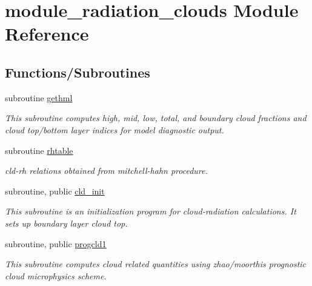 \hypertarget{namespacemodule__radiation__clouds}{}\section{module\+\_\+radiation\+\_\+clouds Module Reference}
\label{namespacemodule__radiation__clouds}
\subsection*{Functions/\+Subroutines}
\begin{DoxyCompactItemize}
\item 
subroutine \hyperlink{group__module__radiation__clouds_gade00b72417f507bb7b07bc58dad58a61}{gethml}
\begin{DoxyCompactList}\small\item\em This subroutine computes high, mid, low, total, and boundary cloud fractions and cloud top/bottom layer indices for model diagnostic output. \end{DoxyCompactList}\item 
subroutine \hyperlink{group__module__radiation__clouds_gaf2368d9f176e9ab76bd9bd7cd687f491}{rhtable}
\begin{DoxyCompactList}\small\item\em cld-\/rh relations obtained from mitchell-\/hahn procedure. \end{DoxyCompactList}\end{DoxyCompactItemize}
{\bf }\par
\begin{DoxyCompactItemize}
\item 
subroutine, public \hyperlink{group__module__radiation__clouds_ga026c2d6859be7119ee7ff11fe760dfcc}{cld\+\_\+init}
\begin{DoxyCompactList}\small\item\em This subroutine is an initialization program for cloud-\/radiation calculations. It sets up boundary layer cloud top. \end{DoxyCompactList}\end{DoxyCompactItemize}

{\bf }\par
\begin{DoxyCompactItemize}
\item 
subroutine, public \hyperlink{group__module__radiation__clouds_gae0f48ab3ed8fcd777d7abaa4f26f2eaf}{progcld1}
\begin{DoxyCompactList}\small\item\em This subroutine computes cloud related quantities using zhao/moorthi\textquotesingle{}s prognostic cloud microphysics scheme. \end{DoxyCompactList}\end{DoxyCompactItemize}

